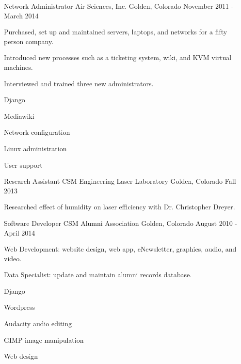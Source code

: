 \begin{cventries}
  \cventry
    {Network Administrator} %
    {Air Sciences, Inc.} %
    {Golden, Colorado} %
    {November 2011 - March 2014} %
    {
      \begin{cvitems} %
        \item {Purchased, set up and maintained servers, laptops, and networks for a fifty person company.}
        \item {Introduced new processes such as a ticketing system, wiki, and KVM virtual machines.}
        \item {Interviewed and trained three new administrators.}
      \end{cvitems}
    }
    \begin{cventryskills}
      \item Django
      \item Mediawiki
      \item Network configuration
      \item Linux administration
      \item User support
    \end{cventryskills}

  \cventry
    {Research Assistant} %
    {CSM Engineering Laser Laboratory} %
    {Golden, Colorado} %
    {Fall 2013} %
    {
      \begin{cvitems} %
        \item {Researched effect of humidity on laser efficiency with Dr. Christopher Dreyer.}
      \end{cvitems}
    }

  \cventry
    {Software Developer} %
    {CSM Alumni Association} %
    {Golden, Colorado} %
    {August 2010 - April 2014} %
    {
      \begin{cvitems} %
        \item {Web Development: website design, web app, eNewsletter, graphics, audio, and video.}
        \item {Data Specialist: update and maintain alumni records database.}
      \end{cvitems}
    }
    \begin{cventryskills}
      \item Django
      \item Wordpress
      \item Audacity audio editing
      \item GIMP image manipulation
      \item Web design
    \end{cventryskills}


\end{cventries}
